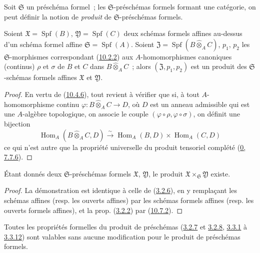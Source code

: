 \begin{env}[10.7.1]
\label{I.10.7.1-fr}
Soit $\mathfrak{S}$ un préschéma formel~; les $\mathfrak{S}$-préschémas
formels formant une catégorie, on peut définir la notion de
\emph{produit} de $\mathfrak{S}$-préschémas formels.
\end{env}

\begin{proposition}[10.7.2]
\label{I.10.7.2-fr}
Soient $\mathfrak{X}=\operatorname{Spf}(B)$,
$\mathfrak{Y}=\operatorname{Spf}(C)$ deux schémas formels affines
au-dessus d'un schéma formel affine
$\mathfrak{S}=\operatorname{Spf}(A)$. Soient
$\mathfrak{Z}=\operatorname{Spf}(B\widehat{\otimes}_A C)$,
$p_1$, $p_2$ les $\mathfrak{S}$-morphismes correspondant
(\hyperref[I.10.2.2-fr]{10.2.2}) aux $A$-homomorphismes canoniques
(continus) $\rho$ et $\sigma$ de $B$ et $C$ dans
$B\widehat{\otimes}_A C$~; alors $(\mathfrak{Z},p_1,p_2)$ est un produit
des $\mathfrak{S}$-schémas formels affines $\mathfrak{X}$ et
$\mathfrak{Y}$.
\end{proposition}

\begin{proof}
En vertu de (\hyperref[I.10.4.6-fr]{10.4.6}), tout revient à vérifier que
si, à tout $A$-homomorphisme continu
$\varphi:B\widehat{\otimes}_A C\to D$, où $D$ est un anneau admissible qui
est une $A$-algèbre topologique, on associe le couple
$(\varphi\circ\rho,\varphi\circ\sigma)$, on définit une bijection
\[
  \operatorname{Hom}_A(B\widehat{\otimes}_A C,D)
  \xrightarrow{\sim}
  \operatorname{Hom}_A(B,D)\times\operatorname{Hom}_A(C,D)
\]
ce qui n'est autre que la propriété universelle du produit tensoriel
complété (\hyperref[0.7.7.6-fr]{0, 7.7.6}).
\end{proof}

\begin{proposition}[10.7.3]
\label{I.10.7.3-fr}
Étant donnés deux $\mathfrak{S}$-préschémas formels
$\mathfrak{X}$, $\mathfrak{Y}$, le produit
$\mathfrak{X}\times_{\mathfrak{S}}\mathfrak{Y}$ existe.
\end{proposition}

\begin{proof}
La démonstration est identique à celle de
(\hyperref[I.3.2.6-fr]{3.2.6}), en y remplaçant les schémas affines
(resp. les ouverts affines) par les schémas formels affines (resp. les
ouverts formels affines), et la prop.
(\hyperref[I.3.2.2-fr]{3.2.2}) par
(\hyperref[I.10.7.2-fr]{10.7.2}).
\end{proof}

Toutes les propriétés formelles du produit de préschémas
(\hyperref[I.3.2.7-fr]{3.2.7} et
\hyperref[I.3.2.8-fr]{3.2.8},
\hyperref[I.3.3.1-fr]{3.3.1} à
\hyperref[I.3.3.12-fr]{3.3.12}) sont valables sans aucune modification
pour le produit de préschémas formels.

